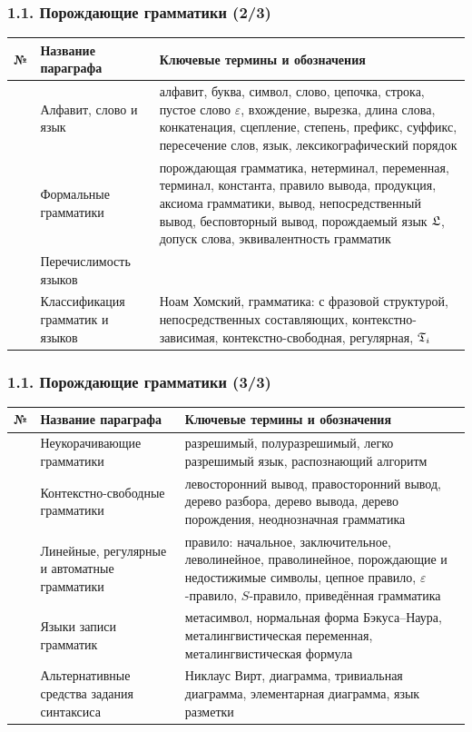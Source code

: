 \documentclass[mathserif,12pt,aspectratio=169]{beamer}
\def\DMref#1#2{{\color{blue}\underline{\hyperlink{#2}{#1}}}}
\begin{document}
\begin{frame}
\frametitle{1.1. Порождающие грамматики (2/3)}

\begin{tabular}{p{10mm}|p{40mm}|p{95mm}}
  № & Название параграфа
  & Ключевые термины и обозначения \\
  \hline
 \text{\DMref{1.1.1.}{1.1.1.}} &  Алфавит, слово и язык
  & {  
  алфавит, буква, символ, слово, цепочка, строка, пустое слово $\varepsilon$,
  вхождение, вырезка, длина слова, конкатенация, сцепление, степень, префикс, суффикс,
  пересечение слов, язык, лексикографический порядок }
   \\
\text{\DMref{1.1.2.}{1.1.2.}} & Формальные грамматики 
  & 
{ порождающая грамматика,
  нетерминал, переменная, терминал, константа,
  правило вывода, продукция, аксиома грамматики,
  вывод, непосредственный вывод, бесповторный вывод, 
  порождаемый язык $\frak{L}$,  допуск слова,
  эквивалентность грамматик  
}
  \\
\text{\DMref{1.1.3.}{1.1.3.}}  & Перечислимость языков &
\\
\text{\DMref{1.1.4.}{1.1.4.}}  & Классификация грамматик и языков &
{Ноам Хомский, грамматика: с фразовой структу\-рой, непосредственных составляющих,
 контекстно-зависи\-мая, контекстно-свободная,
 регулярная, $\frak{T}_i$
 } 
\end{tabular}

\end{frame}


\begin{frame}
\frametitle{1.1. Порождающие грамматики (3/3)}

\begin{tabular}{p{10mm}|p{40mm}|p{95mm}}
  № & Название параграфа
  & Ключевые термины и обозначения \\
  \hline
\text{\DMref{1.1.5.}{1.1.5.}} & Неукорачивающие грамматики &
{разрешимый, полуразрешимый, легко разрешимый язык, распознающий алгоритм}\\   
\text{\DMref{1.1.6.}{1.1.6.}} & Контекстно-свободные грамматики &
{левосторонний вывод, правосторонний вывод, дерево разбора, дерево вывода,
дерево порождения, неоднозначная грамматика}\\   
\text{\DMref{1.1.7.}{1.1.7.}} & Линейные, регулярные и автоматные грамматики &
{правило: начальное, заключительное, леволинейное, праволинейное, 
порождающие и недостижимые символы, цепное правило, 
$\varepsilon$-правило, $S$-правило, приведённая грамматика }\\   
\text{\DMref{1.1.8.}{1.1.8.}} & Языки записи грамматик &
{ метасимвол, нормальная форма Бэкуса--Наура,
металингвистическая переменная, металингвистическая формула }\\   
\text{\DMref{1.1.9.}{1.1.9.}} & Альтернативные средства задания синтаксиса &
{Никлаус Вирт, диаграмма, тривиальная диаграмма, элементарная диаграмма, 
язык разметки   }\\   

\end{tabular}

\end{frame}
\end{document}
